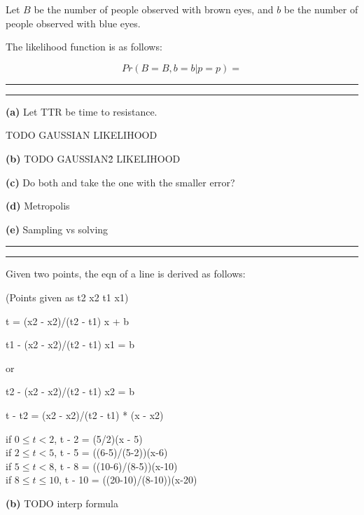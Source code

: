 \documentclass[11pt,letterpaper]{article}
\newcommand{\question}[1] {\vspace{.25in} \hrule\vspace{0.5em}
\noindent{\bf #1} \vspace{0.5em}
\hrule \vspace{.10in}}
\renewcommand{\part}[1] {\vspace{.10in} {\bf (#1)}}
\begin{document}
Let $B$ be the number of people observed with brown eyes,
and $b$ be the number of people observed with blue eyes.

The likelihood function is as follows:

$$Pr(B=B, b=b | p=p) = $$

\question{2}

\part{a}
Let TTR be time to resistance.

TODO GAUSSIAN LIKELIHOOD

\part{b}
TODO GAUSSIAN\^2 LIKELIHOOD

\part{c}
Do both and take the one with the smaller error?

\part{d}
Metropolis

\part{e}
Sampling vs solving

\question{3}
Given two points, the eqn of a line is derived as follows:

(Points given as
    t2 x2 t1 x1)

t = (x2 - x2)/(t2 - t1) x + b

    t1 - (x2 - x2)/(t2 - t1) x1 = b

    or 

    t2 - (x2 - x2)/(t2 - t1) x2 = b

t - t2 = (x2 - x2)/(t2 - t1) * (x - x2)



if $0 \leq t < 2$, t - 2 = (5/2)(x - 5)\\
if $2 \leq t < 5$, t - 5 = ((6-5)/(5-2))(x-6)\\
if $5 \leq t < 8$, t - 8 = ((10-6)/(8-5))(x-10)\\
if $8 \leq t \leq 10$, t - 10 = ((20-10)/(8-10))(x-20)

\part{b}
TODO interp formula
\end{document}
